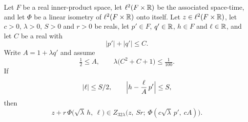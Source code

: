 \begin{lemma}
Let $F$ be a real inner-product space, let $\ell^2(F\times\mathbb{R})$ be the associated
space-time, and let $\Phi$ be a linear isometry of $\ell^2(F\times\mathbb{R})$ onto
itself. Let $z\in\ell^2(F\times\mathbb{R})$, let $c>0$, $\lambda>0$, $S>0$ and $r>0$ be
reals, let $p'\in F$, $q'\in\mathbb{R}$, $h\in F$ and $\ell\in\mathbb{R}$, and let $C$ be a real
with
\begin{equation}\label{eq:sbfc-coeff}
  |p'|+|q'|\le C .
\end{equation}
Write $A=1+\lambda q'$ and assume
\begin{equation}\label{eq:sbfc-A}
  \tfrac12\le A,
  \qquad \lambda\bigl(C^2+C+1\bigr)\le\tfrac1{100} .
\end{equation}
If
\begin{equation}\label{eq:sbfc-domain}
  |\ell|\le S/2,\qquad \Bigl|h-\frac\ell A\,p'\Bigr|\le S,
\end{equation}
then
\[
  z+r\,\Phi\bigl(\sqrt\lambda\,h,\ \ell\bigr)
   \in Z_{32\lambda}\bigl(z,\ Sr;\ \Phi(c\sqrt\lambda\,p',\ cA)\bigr).
\]
\end{lemma}
